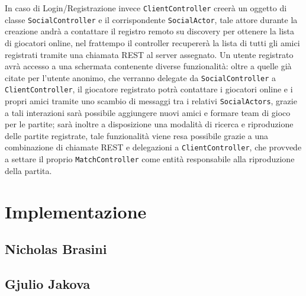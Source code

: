 In caso di Login/Registrazione invece \texttt{ClientController} creerà un oggetto di classe \texttt{SocialController} e il corrispondente \texttt{SocialActor}, tale attore durante la creazione andrà a contattare il registro remoto su discovery per ottenere la lista di giocatori online, nel frattempo il controller recupererà la lista di tutti gli amici registrati tramite una chiamata REST al server assegnato. Un utente registrato avrà accesso a una schermata contenente diverse funzionalità: oltre a quelle già citate per l'utente anonimo, che verranno delegate da \texttt{SocialController} a \texttt{ClientController}, il giocatore registrato potrà contattare i giocatori online e i propri amici tramite uno scambio di messaggi tra i relativi \texttt{SocialActors}, grazie a tali interazioni sarà possibile aggiungere nuovi amici e formare team di gioco per le partite; sarà inoltre a disposizione una modalità di ricerca e riproduzione delle partite registrate, tale funzionalità viene resa possibile grazie a una combinazione di chiamate REST e delegazioni a \texttt{ClientController}, che provvede a settare il proprio \texttt{MatchController} come entità responsabile alla riproduzione della partita.    
  
\clearpage

	\setcounter{figure}{0}
    \section{Implementazione}\label{sec:implementation}
        \subsection{Nicholas Brasini}\label{subsec:brasini}
        \subsection{Gjulio Jakova}\label{subsec:jakova}
